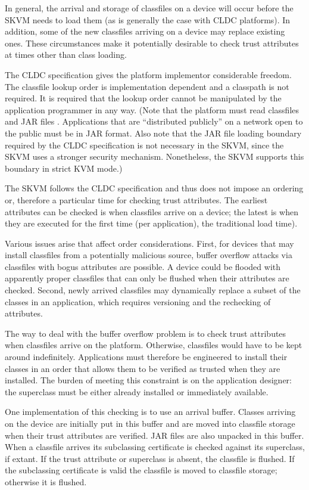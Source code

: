 \documentclass{llncs}
\begin{document}
In general, the arrival and storage of classfiles on a device will occur
before the SKVM needs to load them (as is generally the case with CLDC
platforms). In addition, some of the new classfiles arriving on a device
may replace existing ones. These circumstances make it potentially
desirable to check trust attributes at times other than class loading.

The CLDC specification \cite[section 5.3]{cldc} gives the platform implementor
considerable freedom. The classfile lookup order is implementation
dependent and a classpath is not required. It is required that the lookup
order cannot be manipulated by the application programmer in any way.
(Note that the platform must read classfiles and JAR files \cite[section
5.3.1]{cldc}. Applications that are ``distributed publicly'' on a network open
to the public must be in JAR format. Also note that the JAR file loading
boundary required by the CLDC specification is not necessary in the
SKVM, since the SKVM uses a stronger security mechanism. Nonetheless,
the SKVM supports this boundary in strict KVM mode.)

The SKVM follows the CLDC specification and thus does not impose an
ordering or, therefore a particular time for checking trust attributes.
The earliest attributes can be checked is when classfiles arrive on a
device; the latest is when they are executed for the first time (per
application), the traditional load time).

Various issues arise that affect order considerations. First, for
devices that may install classfiles from a potentially malicious source,
buffer overflow attacks via classfiles with bogus attributes are
possible. A device could be flooded with apparently proper classfiles
that can only be flushed when their attributes are checked. Second,
newly arrived classfiles may dynamically replace a subset of the classes
in an application, which requires versioning and the rechecking of
attributes.

The way to deal with the buffer overflow problem is to check trust
attributes when classfiles arrive on the platform. Otherwise, classfiles
would have to be kept around indefinitely. Applications must therefore
be engineered to install their classes in an order that allows them to
be verified as trusted when they are installed. The burden of meeting
this constraint is on the application designer: the superclass must be
either already installed or immediately available.

One implementation of this checking is to use an arrival buffer. Classes
arriving on the device are initially put in this buffer and are moved
into classfile storage when their trust attributes are verified. JAR
files are also unpacked in this buffer. When a classfile arrives its
subclassing certificate is checked against its superclass, if extant. If
the trust attribute or superclass is absent, the classfile is flushed.
If the subclassing certificate is valid the classfile is moved to
classfile storage; otherwise it is flushed.
\end{document}
